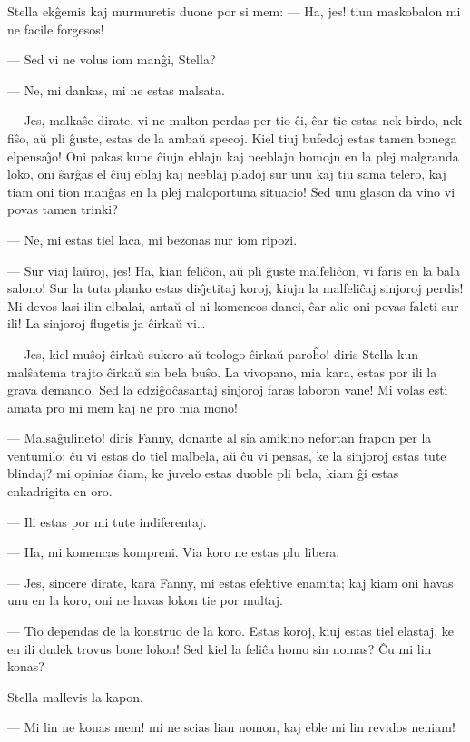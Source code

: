    Stella ek\^gemis kaj murmuretis duone por si mem: --- Ha, jes! tiun
maskobalon mi ne facile forgesos!

 --- Sed vi ne volus iom man\^gi, Stella?

 --- Ne, mi dankas, mi ne estas malsata.

 --- Jes, malka\^se dirate, vi ne multon perdas per tio \^ci, \^car tie
estas nek birdo, nek fi\^so, a\u u pli \^guste, estas de la amba\u u
specoj. Kiel tiuj bufedoj estas tamen bonega elpensa\^{\j}o! Oni
pakas kune \^ciujn eblajn kaj neeblajn homojn en la plej malgranda
loko, oni \^sar\^gas el \^ciuj eblaj kaj neeblaj pladoj sur unu kaj
tiu sama telero, kaj tiam oni tion man\^gas en la plej maloportuna
situacio! Sed unu glason da vino vi povas tamen trinki?

 --- Ne, mi estas tiel laca, mi bezonas nur iom ripozi.

 --- Sur viaj la\u uroj, jes! Ha, kian feli\^con, a\u u pli \^guste
malfeli\^con, vi faris en la bala salono! Sur la tuta planko estas
dis\^{\j}etitaj koroj, kiujn la malfeli\^caj sinjoroj perdis! Mi
devos lasi ilin elbalai, anta\u u ol ni komencos danci, \^car alie
oni povas faleti sur ili! La sinjoroj flugetis ja \^cirka\u u
vi\dots

 --- Jes, kiel mu\^soj \^cirka\u u sukero a\u u teologo \^cirka\u u paro\^ho!
diris Stella kun mal\^satema trajto \^cirka\u u sia bela bu\^so. La
vivopano, mia kara, estas por ili la grava demando. Sed la
edzi\^go\^casantaj sinjoroj faras laboron vane! Mi volas esti amata
pro mi mem kaj ne pro mia mono!

 --- Malsa\^gulineto! diris Fanny, donante al sia amikino nefortan
frapon per la ventumilo; \^cu vi estas do tiel malbela, a\u u \^cu
vi pensas, ke la sinjoroj estas tute blindaj? mi opinias \^ciam, ke
juvelo estas duoble pli bela, kiam \^gi estas enkadrigita en oro.

 --- Ili estas por mi tute indiferentaj.

 --- Ha, mi komencas kompreni. Via koro ne estas plu libera.

 --- Jes, sincere dirate, kara Fanny, mi estas efektive enamita; kaj
kiam oni havas unu en la koro, oni ne havas lokon tie por multaj.

 --- Tio dependas de la konstruo de la koro. Estas koroj, kiuj estas
tiel elastaj, ke en ili dudek trovus bone lokon! Sed kiel la
feli\^ca homo sin nomas? \^Cu mi lin konas?

   Stella mallevis la kapon.

 --- Mi lin ne konas mem! mi ne scias lian nomon, kaj eble mi lin
revidos neniam!

